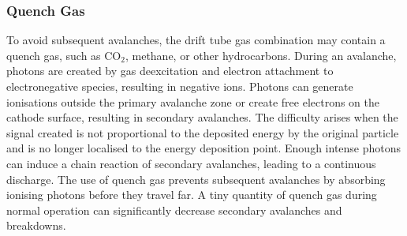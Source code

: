 \subsubsection{Quench Gas}
To avoid subsequent avalanches, the drift tube gas combination may contain a quench gas, such as CO$_2$, 
methane, or other hydrocarbons. During an avalanche, photons are created by gas deexcitation and electron 
attachment to electronegative species, resulting in negative ions. Photons can generate ionisations 
outside the primary avalanche zone or create free electrons on the cathode surface, resulting in secondary avalanches.
The difficulty arises when the signal created is not proportional to the deposited energy by the original particle 
and is no longer localised to the energy deposition point. Enough intense photons can induce a chain reaction of 
secondary avalanches, leading to a continuous discharge. The use of quench gas prevents subsequent 
avalanches by absorbing ionising photons before they travel far. A tiny quantity of quench gas during normal operation 
can significantly decrease secondary avalanches and breakdowns.

